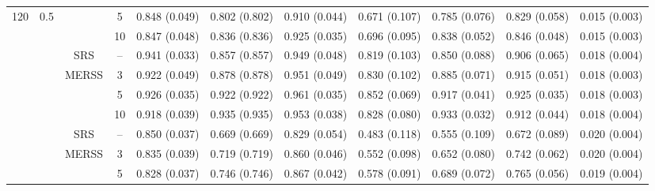 \documentclass[twoside]{article}
\begin{document}
\begin{table}[!htb]
{\begin{tabular}{c c c c c c c c c c c}
 120 &          0.5            &                                          &  5    &
   0.848 (0.049) & 0.802 (0.802) & 0.910 (0.044) & 0.671 (0.107) & 0.785 (0.076) & 0.829 (0.058)& 0.015 (0.003)  \\

    &                      &                                          &  10   &
    0.847 (0.048) & 0.836 (0.836) & 0.925 (0.035) & 0.696 (0.095) & 0.838 (0.052) & 0.846 (0.048)& 0.015 (0.003)  \\
  

    \cmidrule(lr){2-11}
 &\multirow{9}{*}{ }  & 
    \multirow{1}{*}{SRS} & -- 
 &0.941 (0.033) & 0.857 (0.857) & 0.949 (0.048) & 0.819 (0.103) & 0.850 (0.088) & 0.906 (0.065)& 0.018 (0.004)  \\
    
    \cmidrule(lr){3-11}
    &                      & \multirow{3}{*}{MERSS}   &  3   & 
    0.922 (0.049) & 0.878 (0.878) & 0.951 (0.049) & 0.830 (0.102) & 0.885 (0.071) & 0.915 (0.051)& 0.018 (0.003)  \\

    &               0.7       &                                          &  5    &
   0.926 (0.035) & 0.922 (0.922) & 0.961 (0.035) & 0.852 (0.069) & 0.917 (0.041) & 0.925 (0.035)& 0.018 (0.003)  \\

    &                      &                                          &  10   &
  0.918 (0.039) & 0.935 (0.935) & 0.953 (0.038) & 0.828 (0.080) & 0.933 (0.032) & 0.912 (0.044)& 0.018 (0.004)  \\

    \bottomrule 
    
    \multirow{27}{*}{} & 
    \multirow{9}{*}{ }  & 
    \multirow{1}{*}{SRS} & -- 
 &0.850 (0.037) & 0.669 (0.669) & 0.829 (0.054) & 0.483 (0.118) & 0.555 (0.109) & 0.672 (0.089)& 0.020 (0.004)  \\
   
    \cmidrule(lr){3-11}
    &                      & \multirow{3}{*}{MERSS}   &  3   & 
   0.835 (0.039) & 0.719 (0.719) & 0.860 (0.046) & 0.552 (0.098) & 0.652 (0.080) & 0.742 (0.062)& 0.020 (0.004)  \\

    &         0.3             &                                          &  5    &
    0.828 (0.037) & 0.746 (0.746) & 0.867 (0.042) & 0.578 (0.091) & 0.689 (0.072) & 0.765 (0.056)& 0.019 (0.004)  \\


\end{tabular}}
\end{table}
\end{document}
